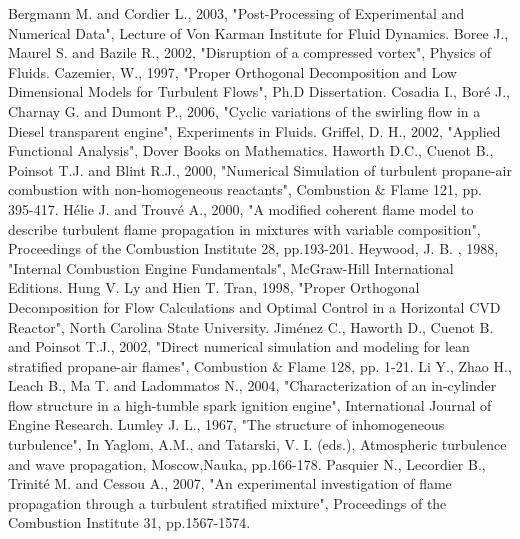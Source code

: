 \documentclass[12pt,a4paper]{article}
\begin{document}
\begin{thebibliography}{1}
 Bergmann M. and Cordier L., 2003, "Post-Processing of Experimental and Numerical Data", Lecture of Von Karman Institute for Fluid Dynamics.
 Boree J., Maurel S. and Bazile R., 2002, "Disruption of a compressed vortex", Physics of Fluids.
 Cazemier, W., 1997, "Proper Orthogonal Decomposition and Low Dimensional Models for Turbulent Flows", Ph.D Dissertation.
  Cosadia I., Bor\'{e} J., Charnay G. and Dumont P., 2006, "Cyclic variations of the swirling flow in a Diesel transparent engine", Experiments in Fluids.
 Griffel, D. H., 2002, "Applied Functional Analysis", Dover Books on Mathematics.
 Haworth D.C., Cuenot B., Poinsot T.J. and Blint R.J., 2000, "Numerical Simulation of turbulent propane-air combustion with non-homogeneous reactants", Combustion $\&$ Flame 121, pp. 395-417.
 H\'{e}lie J. and Trouv\'{e} A., 2000, "A modified coherent flame model to describe turbulent flame propagation in mixtures with variable composition", Proceedings of the Combustion Institute 28, pp.193-201.
 Heywood, J. B. , 1988, "Internal Combustion Engine Fundamentals", McGraw-Hill International Editions.
 Hung V. Ly and Hien T. Tran, 1998, "Proper Orthogonal Decomposition for Flow Calculations and Optimal Control in a Horizontal CVD Reactor", North Carolina State University.
 Jim\'{e}nez C., Haworth D., Cuenot B. and Poinsot T.J., 2002, "Direct numerical simulation and modeling for lean stratified propane-air flames", Combustion $\&$ Flame 128, pp. 1-21.
 Li Y., Zhao H., Leach B., Ma T. and Ladommatos N., 2004, "Characterization of an in-cylinder flow structure in a high-tumble spark ignition engine", International Journal  of Engine Research.
 Lumley J. L., 1967, "The structure of inhomogeneous turbulence", In Yaglom, A.M., and Tatarski, V. I. (eds.), Atmospheric turbulence and wave propagation, Moscow,Nauka, pp.166-178.
 Pasquier N., Lecordier B., Trinit\'{e} M. and Cessou A., 2007, "An experimental investigation of flame propagation through a turbulent stratified mixture", Proceedings of the Combustion Institute 31, pp.1567-1574.

\end{thebibliography}
\end{document}
